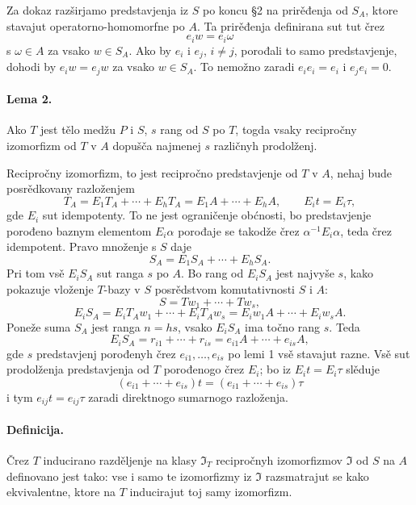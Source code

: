 \documentclass[11pt]{article}
\begin{document}
Za dokaz razširjamo predstavjenja iz \(S\) po koncu §2 na prirěđenja od \(S_A\), ktore stavajut operatorno-homomorfne po \(A\). Ta prirěđenja definirana sut tut črez
\[
        e_i w=e_i\omega
\]
s \(\omega\in A\) za vsako \(w\in S_A\). Ako by \(e_i\) i \(e_j\), \(i\ne j\), porođali to samo predstavjenje, dohodi by \(e_iw=e_jw\) za vsako \(w\in S_A\). To nemožno zaradi \(e_ie_i=e_i\) i \(e_je_i=0\).

\paragraph{Lema 2.}
Ako \(T\) jest tělo medžu \(P\) i \(S\), \(s\) rang od \(S\) po \(T\), togda vsaky recipročny izomorfizm od \(T\) v \(A\) dopušča najmenej \(s\) različnyh prodolženj.

Recipročny izomorfizm, to jest recipročno predstavjenje od \(T\) v \(A\), nehaj bude posrědkovany razloženjem
\[
        T_A=E_1T_A+\cdots+E_hT_A
            =E_1A+\cdots+E_hA,
        \qquad E_it=E_i\tau ,
\]
gde \(E_i\) sut idempotenty. To ne jest ograničenje obćnosti, bo predstavjenje porođeno baznym elementom \(E_i\alpha\) porođaje se takodže črez \(\alpha^{-1}E_i\alpha\), teda črez idempotent. Pravo množenje s \(S\) daje
\[
        S_A=E_1S_A+\cdots+E_hS_A .
\]
Pri tom vsě \(E_iS_A\) sut ranga \(s\) po \(A\). Bo rang od \(E_iS_A\) jest najvyše \(s\), kako pokazuje vloženje \(T\)-bazy v \(S\) posrědstvom komutativnosti \(S\) i \(A\):
\[
        S=Tw_1+\cdots+Tw_s,
\]
\[
        E_iS_A=E_iT_Aw_1+\cdots+E_iT_Aw_s
              =E_iw_1A+\cdots+E_iw_sA .
\]
Poneže suma \(S_A\) jest ranga \(n=hs\), vsako \(E_iS_A\) ima točno rang \(s\). Teda
\[
        E_iS_A=r_{i1}+\cdots+r_{is}
              =e_{i1}A+\cdots+e_{is}A,
\]
gde \(s\) predstavjenj porođenyh črez \(e_{i1},\ldots,e_{is}\) po lemi 1 vsě stavajut razne. Vsě sut prodolženja predstavjenja od \(T\) porođenogo črez \(E_i\); bo iz \(E_it=E_i\tau\) slěduje
\[
        (e_{i1}+\cdots+e_{is})t=(e_{i1}+\cdots+e_{is})\tau
\]
i tym \(e_{ij}t=e_{ij}\tau\) zaradi direktnogo sumarnogo razloženja.

\paragraph{Definicija.}
Črez \(T\) inducirano razděljenje na klasy \(\mathfrak I_T\) recipročnyh izomorfizmov \(\mathfrak I\) od \(S\) na \(A\) definovano jest tako: vse i samo te izomorfizmy iz \(\mathfrak I\) razsmatrajut se kako ekvivalentne, ktore na \(T\) inducirajut toj samy izomorfizm.
\end{document}
